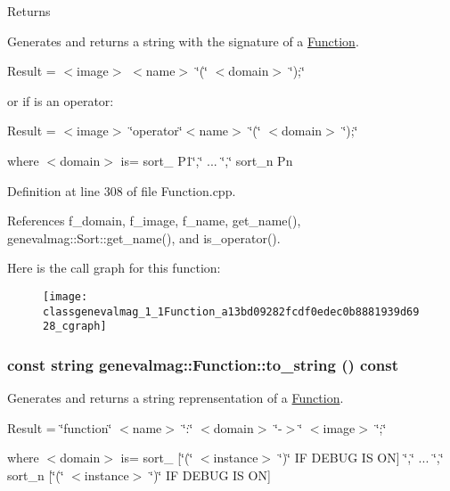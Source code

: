 \begin{DoxyReturn}{Returns}

\end{DoxyReturn}
Generates and returns a string with the signature of a \hyperlink{classgenevalmag_1_1Function}{Function}.

Result = $<$image$>$ $<$name$>$ \char`\"{}(\char`\"{} $<$domain$>$ \char`\"{});\char`\"{}

or if is an operator:

Result = $<$image$>$ \char`\"{}operator\char`\"{}$<$name$>$ \char`\"{}(\char`\"{} $<$domain$>$ \char`\"{});\char`\"{}

where $<$domain$>$ is= sort\_ P1\char`\"{},\char`\"{} ... \char`\"{},\char`\"{} sort\_\-n Pn 

Definition at line 308 of file Function.cpp.



References f\_\-domain, f\_\-image, f\_\-name, get\_\-name(), genevalmag::Sort::get\_\-name(), and is\_\-operator().



Here is the call graph for this function:\nopagebreak
\begin{figure}[H]
\begin{center}
\leavevmode
\texttt{[image: classgenevalmag\_1\_1Function\_a13bd09282fcdf0edec0b8881939d6928\_cgraph]}
\end{center}
\end{figure}


\hypertarget{classgenevalmag_1_1Function_ae730b6f7f0108383e1acbdde13813585}{
\subsubsection[{to\_\-string}]{\setlength{\rightskip}{0pt plus 5cm}const string genevalmag::Function::to\_\-string () const}}
\label{classgenevalmag_1_1Function_ae730b6f7f0108383e1acbdde13813585}
Generates and returns a string reprensentation of a \hyperlink{classgenevalmag_1_1Function}{Function}.\par
 \par
 Result = \char`\"{}function\char`\"{} $<$name$>$ \char`\"{}:\char`\"{} $<$domain$>$ \char`\"{}-\/$>$\char`\"{} $<$image$>$ \char`\"{};\char`\"{}\par
 \par
 where $<$domain$>$ is= sort\_ \mbox{[}\char`\"{}(\char`\"{} $<$instance$>$ \char`\"{})\char`\"{} IF DEBUG IS ON\mbox{]} \char`\"{},\char`\"{} ... \char`\"{},\char`\"{} sort\_\-n \mbox{[}\char`\"{}(\char`\"{} $<$instance$>$ \char`\"{})\char`\"{} IF DEBUG IS ON\mbox{]}\par


